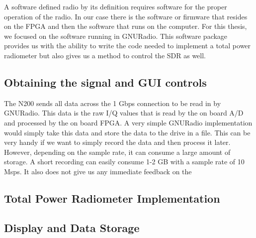 A software defined radio by its definition requires software for the proper operation of the radio.  In our case there is the software or firmware that resides on the FPGA and then the software that runs on the computer.  For this thesis, we focused on the software running in GNURadio.  This software package provides us with the ability to write the code needed to implement a total power radiometer but also gives us a method to control the SDR as well.  

\subsection{Obtaining the signal and GUI controls}

The N200 sends all data across the 1 Gbps connection to be read in by GNURadio.  This data is the raw I/Q values that is read by the on board A/D and processed by the on board FPGA.  A very simple GNURadio implementation would simply take this data and store the data to the drive in a file.  This can be very handy if we want to simply record the data and then process it later.  However, depending on the sample rate, it can consume a large amount of storage.  A short recording can easily consume 1-2 GB with a sample rate of 10 Msps.  It also does not give us any immediate feedback on the 

\subsection{Total Power Radiometer Implementation}

\subsection{Display and Data Storage}